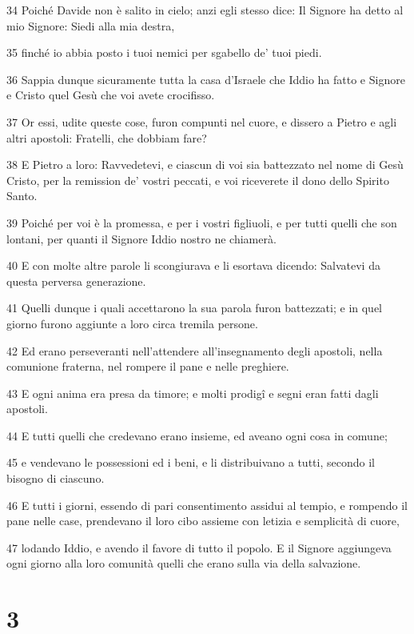 \par 34 Poiché Davide non è salito in cielo; anzi egli stesso dice: Il Signore ha detto al mio Signore: Siedi alla mia destra,
\par 35 finché io abbia posto i tuoi nemici per sgabello de' tuoi piedi.
\par 36 Sappia dunque sicuramente tutta la casa d'Israele che Iddio ha fatto e Signore e Cristo quel Gesù che voi avete crocifisso.
\par 37 Or essi, udite queste cose, furon compunti nel cuore, e dissero a Pietro e agli altri apostoli: Fratelli, che dobbiam fare?
\par 38 E Pietro a loro: Ravvedetevi, e ciascun di voi sia battezzato nel nome di Gesù Cristo, per la remission de' vostri peccati, e voi riceverete il dono dello Spirito Santo.
\par 39 Poiché per voi è la promessa, e per i vostri figliuoli, e per tutti quelli che son lontani, per quanti il Signore Iddio nostro ne chiamerà.
\par 40 E con molte altre parole li scongiurava e li esortava dicendo: Salvatevi da questa perversa generazione.
\par 41 Quelli dunque i quali accettarono la sua parola furon battezzati; e in quel giorno furono aggiunte a loro circa tremila persone.
\par 42 Ed erano perseveranti nell'attendere all'insegnamento degli apostoli, nella comunione fraterna, nel rompere il pane e nelle preghiere.
\par 43 E ogni anima era presa da timore; e molti prodigî e segni eran fatti dagli apostoli.
\par 44 E tutti quelli che credevano erano insieme, ed aveano ogni cosa in comune;
\par 45 e vendevano le possessioni ed i beni, e li distribuivano a tutti, secondo il bisogno di ciascuno.
\par 46 E tutti i giorni, essendo di pari consentimento assidui al tempio, e rompendo il pane nelle case, prendevano il loro cibo assieme con letizia e semplicità di cuore,
\par 47 lodando Iddio, e avendo il favore di tutto il popolo. E il Signore aggiungeva ogni giorno alla loro comunità quelli che erano sulla via della salvazione.

\chapter{3}

